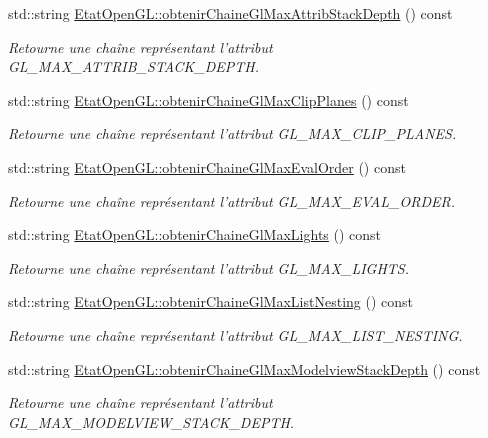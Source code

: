 \begin{DoxyCompactItemize}
std\-::string \hyperlink{group__utilitaire_gaa03eca9a37a755a11183714292f89779}{Etat\-Open\-G\-L\-::obtenir\-Chaine\-Gl\-Max\-Attrib\-Stack\-Depth} () const 
\begin{DoxyCompactList}\small\item\em Retourne une chaîne représentant l'attribut G\-L\-\_\-\-M\-A\-X\-\_\-\-A\-T\-T\-R\-I\-B\-\_\-\-S\-T\-A\-C\-K\-\_\-\-D\-E\-P\-T\-H. \end{DoxyCompactList}\item 
std\-::string \hyperlink{group__utilitaire_gae90d5285df064d711bedd09091ba413b}{Etat\-Open\-G\-L\-::obtenir\-Chaine\-Gl\-Max\-Clip\-Planes} () const 
\begin{DoxyCompactList}\small\item\em Retourne une chaîne représentant l'attribut G\-L\-\_\-\-M\-A\-X\-\_\-\-C\-L\-I\-P\-\_\-\-P\-L\-A\-N\-E\-S. \end{DoxyCompactList}\item 
std\-::string \hyperlink{group__utilitaire_gaf82e6892182ffe565a05329073a06248}{Etat\-Open\-G\-L\-::obtenir\-Chaine\-Gl\-Max\-Eval\-Order} () const 
\begin{DoxyCompactList}\small\item\em Retourne une chaîne représentant l'attribut G\-L\-\_\-\-M\-A\-X\-\_\-\-E\-V\-A\-L\-\_\-\-O\-R\-D\-E\-R. \end{DoxyCompactList}\item 
std\-::string \hyperlink{group__utilitaire_ga95b23ba66220abe4def913fd80f31f9c}{Etat\-Open\-G\-L\-::obtenir\-Chaine\-Gl\-Max\-Lights} () const 
\begin{DoxyCompactList}\small\item\em Retourne une chaîne représentant l'attribut G\-L\-\_\-\-M\-A\-X\-\_\-\-L\-I\-G\-H\-T\-S. \end{DoxyCompactList}\item 
std\-::string \hyperlink{group__utilitaire_gaab626bdfc4cf8d6445955270799c969a}{Etat\-Open\-G\-L\-::obtenir\-Chaine\-Gl\-Max\-List\-Nesting} () const 
\begin{DoxyCompactList}\small\item\em Retourne une chaîne représentant l'attribut G\-L\-\_\-\-M\-A\-X\-\_\-\-L\-I\-S\-T\-\_\-\-N\-E\-S\-T\-I\-N\-G. \end{DoxyCompactList}\item 
std\-::string \hyperlink{group__utilitaire_ga7a7a64fd525a66dfc542f8d38470e6df}{Etat\-Open\-G\-L\-::obtenir\-Chaine\-Gl\-Max\-Modelview\-Stack\-Depth} () const 
\begin{DoxyCompactList}\small\item\em Retourne une chaîne représentant l'attribut G\-L\-\_\-\-M\-A\-X\-\_\-\-M\-O\-D\-E\-L\-V\-I\-E\-W\-\_\-\-S\-T\-A\-C\-K\-\_\-\-D\-E\-P\-T\-H. \end{DoxyCompactList}\item 

\end{DoxyCompactItemize}
